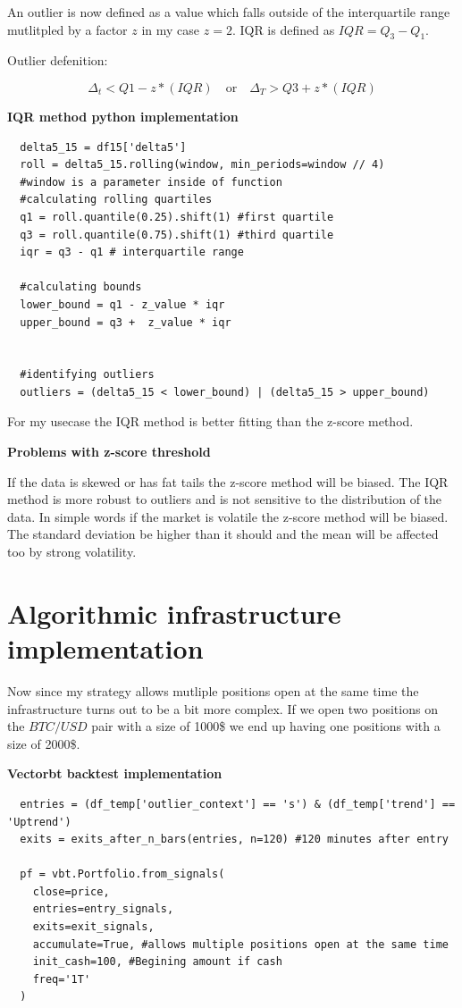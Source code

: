 \documentclass[12pt]{article}
\begin{document}
An outlier is now defined as a value which falls outside of the interquartile range mutlitpled by a factor $z$ in my case $z = 2$. IQR is defined as $IQR = Q_3 - Q_1$.


Outlier defenition:

\begin{equation*}
  \Delta_t < Q1-z*(IQR) \quad \text{or} \quad \Delta_T >Q3+z*(IQR)
\end{equation*}

\newpage
\textbf{IQR method python implementation}
\begin{verbatim}
  delta5_15 = df15['delta5']
  roll = delta5_15.rolling(window, min_periods=window // 4)
  #window is a parameter inside of function
  #calculating rolling quartiles
  q1 = roll.quantile(0.25).shift(1) #first quartile
  q3 = roll.quantile(0.75).shift(1) #third quartile
  iqr = q3 - q1 # interquartile range

  #calculating bounds
  lower_bound = q1 - z_value * iqr
  upper_bound = q3 +  z_value * iqr
 

  #identifying outliers
  outliers = (delta5_15 < lower_bound) | (delta5_15 > upper_bound)
\end{verbatim}



For my usecase the IQR method is better fitting than the z-score method. 




\textbf{Problems with z-score threshold}

If the data is skewed or has fat tails the z-score method will be biased. The IQR method is more robust to outliers and is not sensitive to the distribution of the data. In simple words if the market is volatile the z-score method will be biased. The standard deviation be higher than it should and the mean will be affected too by strong volatility.







\newpage
\section{Algorithmic infrastructure implementation}
Now since my strategy allows mutliple positions open at the same time the infrastructure turns out to be a bit more complex. If we open two positions on the $BTC/USD$ pair with a size of 1000\$ we end up having one positions with a size of 2000\$. 


\textbf{Vectorbt backtest implementation}
\begin{verbatim}
  entries = (df_temp['outlier_context'] == 's') & (df_temp['trend'] == 'Uptrend')  
  exits = exits_after_n_bars(entries, n=120) #120 minutes after entry
  
  pf = vbt.Portfolio.from_signals(
    close=price,
    entries=entry_signals,
    exits=exit_signals,
    accumulate=True, #allows multiple positions open at the same time
    init_cash=100, #Begining amount if cash
    freq='1T'
  ) 
\end{verbatim}
\end{document}
